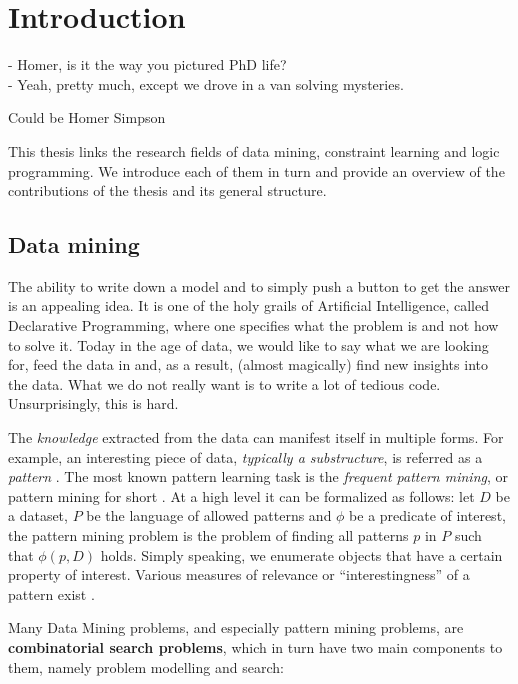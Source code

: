\chapter{Introduction}\label{ch:introduction}
\epigraph{
- Homer, is it the way you pictured PhD life?\\
- Yeah, pretty much, except we drove in a van solving mysteries.
}{Could be Homer Simpson}

\begin{addmargin}[5em]{5em}
This thesis links the research fields of data mining, constraint learning
and logic programming. We introduce each of them in turn and provide an overview of the
contributions of the thesis and
its general structure.
\end{addmargin}

\section{Data mining}
The ability to write down a model and to simply push a button to get the
answer is an appealing idea. It is one of the holy grails of
Artificial Intelligence, called Declarative Programming, where one
specifies what the problem is and not how to solve it. Today in the age of data, we would like
to say what we are looking for, feed the data in and, as a result,
(almost magically) find new insights into the data. What we do not really want is to write
a lot of tedious code. Unsurprisingly, this is hard. 


The \textit{knowledge} extracted from the data can manifest itself in
multiple forms. For example, an interesting piece of data,
\textit{typically a substructure}, is referred as a \textit{pattern} \parencite{han_book}. 
The most known pattern learning task is the
\textit{frequent pattern mining}, or pattern mining for short \parencite{survey_han}. 
At a high level it can be formalized as follows: 
let $D$ be a dataset, $P$ be the language of allowed patterns and
$\phi$ be a predicate of
interest, the pattern mining problem is the problem of finding
all patterns $p$ in $P$ such that $\phi(p,D)$ holds.
Simply speaking, we enumerate objects that have a certain property of
interest.
Various measures of relevance or ``interestingness'' of a pattern exist \parencite{tias_topk}.


Many Data Mining problems, and especially pattern mining
problems, are \textbf{combinatorial search problems}, which in turn have two main components to them, namely problem modelling and search: 

